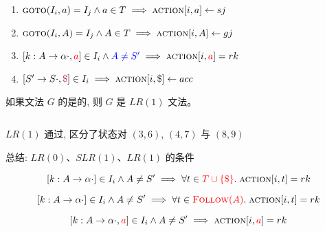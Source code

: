 \begin{frame}{}
  \begin{center}

    \vspace{0.60cm}
    \begin{enumerate}[(1)]
      \setlength{\itemsep}{25pt}
      \item $\textsc{goto}(I_{i}, a) = I_{j} \land a \in T \implies \textsc{action}[i, a] \gets sj$
      \item $\textsc{goto}(I_{i}, A) = I_{j} \land A \in T \implies \textsc{action}[i, A] \gets gj$
      \item $[k: A \to \alpha \cdot, \textcolor{red}{a}] \in I_{i} \land \textcolor{blue}{A \neq S'} \implies
        \textsc{action}[i, \textcolor{red}{a}] = rk$
      \item $[S' \to S \cdot, \textcolor{purple}{\$}] \in I_{i} \implies \textsc{action}[i, \$] \gets acc$
    \end{enumerate}

    \pause
    \vspace{0.20cm}
    \begin{definition}[$LR(1)$文法]
      如果文法 $G$ 的是的,
      则 $G$ 是 $LR(1)$ 文法。
    \end{definition}
  \end{center}
\end{frame}

\begin{frame}{}
  \begin{center}
    \begin{columns}
    \end{columns}

    \vspace{0.60cm}
    $LR(1)$ 通过, 区分了状态对 $(3, 6)$, $(4, 7)$ 与 $(8, 9)$
  \end{center}
\end{frame}

\begin{frame}{}
  \begin{center}
    总结: $LR(0)$、$SLR(1)$、$LR(1)$ 的条件

    \[
      [k: A \to \alpha \cdot] \in I_{i} \land A \neq S' \implies
        \forall t \in \textcolor{red}{T \cup \{\$\}}.\; \textsc{action}[i, t] = rk
    \]

    \[
      [k: A \to \alpha \cdot] \in I_{i} \land A \neq S' \implies
        \forall t \in \textcolor{red}{\textsc{Follow}(A)}.\; \textsc{action}[i, t] = rk
    \]

    \[
      [k: A \to \alpha \cdot, \textcolor{red}{a}] \in I_{i} \land A \neq S' \implies
        \textsc{action}[i, \textcolor{red}{a}] = rk
    \]
  \end{center}
\end{frame}

